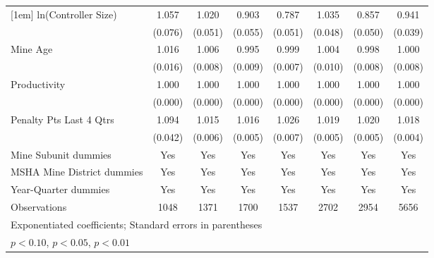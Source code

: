 {\begin{tabular}{l*{7}{c}}
[1em]
ln(Controller Size)      &       1.057         &       1.020         &       0.903\sym{*}  &       0.787\sym{***}&       1.035         &       0.857\sym{***}&       0.941         \\
                         &     (0.076)         &     (0.051)         &     (0.055)         &     (0.051)         &     (0.048)         &     (0.050)         &     (0.039)         \\
[1em]
Mine Age                 &       1.016         &       1.006         &       0.995         &       0.999         &       1.004         &       0.998         &       1.000         \\
                         &     (0.016)         &     (0.008)         &     (0.009)         &     (0.007)         &     (0.010)         &     (0.008)         &     (0.008)         \\
[1em]
Productivity             &       1.000         &       1.000         &       1.000         &       1.000         &       1.000         &       1.000         &       1.000         \\
                         &     (0.000)         &     (0.000)         &     (0.000)         &     (0.000)         &     (0.000)         &     (0.000)         &     (0.000)         \\
[1em]
Penalty Pts Last 4 Qtrs  &       1.094\sym{**} &       1.015\sym{**} &       1.016\sym{***}&       1.026\sym{***}&       1.019\sym{***}&       1.020\sym{***}&       1.018\sym{***}\\
                         &     (0.042)         &     (0.006)         &     (0.005)         &     (0.007)         &     (0.005)         &     (0.005)         &     (0.004)         \\
[1em]
Mine Subunit dummies     &         Yes         &         Yes         &         Yes         &         Yes         &         Yes         &         Yes         &         Yes         \\
[1em]
MSHA Mine District dummies&         Yes         &         Yes         &         Yes         &         Yes         &         Yes         &         Yes         &         Yes         \\
[1em]
Year-Quarter dummies     &         Yes         &         Yes         &         Yes         &         Yes         &         Yes         &         Yes         &         Yes         \\
\hline
Observations             &        1048         &        1371         &        1700         &        1537         &        2702         &        2954         &        5656         \\
\hline\hline
\multicolumn{8}{l}{\footnotesize Exponentiated coefficients; Standard errors in parentheses}\\
\multicolumn{8}{l}{\footnotesize \sym{*} \(p<0.10\), \sym{**} \(p<0.05\), \sym{***} \(p<0.01\)}\\
\end{tabular}
}
